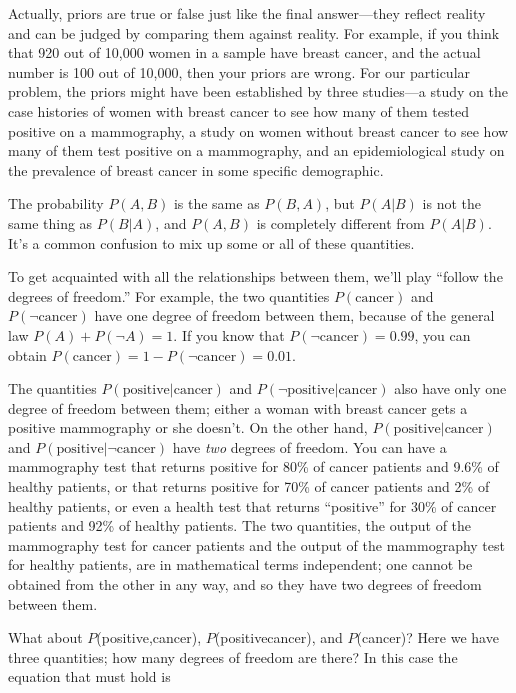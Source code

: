 {
 Actually, priors are true or false just like the final
answer---they reflect reality and can be judged by comparing them
against reality. For example, if you think that 920 out of 10,000 women
in a sample have breast cancer, and the actual number is 100 out of
10,000, then your priors are wrong. For our particular problem, the
priors might have been established by three studies---a study on the
case histories of women with breast cancer to see how many of them
tested positive on a mammography, a study on women without breast
cancer to see how many of them test positive on a mammography, and an
epidemiological study on the prevalence of breast cancer in some
specific demographic.}

\hr

{
 The probability $P(A,B)$ is the same as $P(B,A)$, but $P(A|B)$
is not the same thing as $P(B|A)$, and $P(A,B)$ is completely
different from $P(A|B)$. It's a common confusion
to mix up some or all of these quantities.}

{
 To get acquainted with all the relationships between them,
we'll play ``follow the degrees of
freedom.'' For example, the two quantities $P(\text{cancer})$
and $P(\lnot\text{cancer})$ have one degree of freedom between them,
because of the general law $P(A) + P(\lnot A) = 1$. If you know that
$P(\lnot\text{cancer}) = 0.99$, you can obtain $P(\text{cancer}) = 1 -
P(\lnot\text{cancer}) = 0.01$.}

{
 The quantities $P(\text{positive}|\text{cancer})$ and
$P(\lnot\text{positive}|\text{cancer})$ also have only one degree of
freedom between them; either a woman with breast cancer gets a positive
mammography or she doesn't. On the other hand,
$P(\text{positive}|\text{cancer})$ and $P(\text{positive}|\lnot\text{cancer})$
have \textit{two} degrees of freedom. You can have a mammography test
that returns positive for 80\% of cancer patients and 9.6\% of healthy
patients, or that returns positive for 70\% of cancer patients and 2\%
of healthy patients, or even a health test that returns
``positive'' for 30\% of cancer
patients and 92\% of healthy patients. The two quantities, the output
of the mammography test for cancer patients and the output of the
mammography test for healthy patients, are in mathematical terms
independent; one cannot be obtained from the other in any way, and so
they have two degrees of freedom between them.}

{
 What about $P$(positive,cancer), $P$(positive\textbar cancer), and
$P$(cancer)? Here we have three quantities; how many degrees of freedom
are there? In this case the equation that must hold is}

